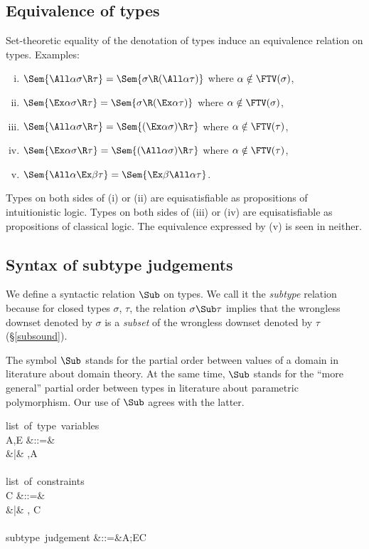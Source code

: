 \documentclass{amsart}
\theoremstyle{definition}
\begin{document}
\subsection{Equivalence of types}
Set-theoretic equality of the denotation of types induce an
equivalence relation on types. Examples:
\begin{enumerate}[(i)]
\item
$\Sem{\All\alpha\sigma\R\tau}=\Sem{\sigma\R(\All\alpha\tau)}$
where $\alpha\notin\FTV(\sigma)$,
\item
$\Sem{\Ex\alpha\sigma\R\tau}=\Sem{\sigma\R(\Ex\alpha\tau)}$
where $\alpha\notin\FTV(\sigma)$,
\item
$\Sem{\All\alpha\sigma\R\tau}=\Sem{(\Ex\alpha\sigma)\R\tau}$
where $\alpha\notin\FTV(\tau)$,
\item
$\Sem{\Ex\alpha\sigma\R\tau}=\Sem{(\All\alpha\sigma)\R\tau}$
where $\alpha\notin\FTV(\tau)$,
\item
$\Sem{\All\alpha\Ex\beta\tau}=\Sem{\Ex\beta\All\alpha\tau}$.
\end{enumerate}
Types on both sides of (i) or (ii) are equisatisfiable as
propositions of intuitionistic logic. Types on both sides of
(iii) or (iv) are equisatisfiable as propositions of classical
logic. The equivalence expressed by (v) is seen in neither.


\subsection{Syntax of subtype judgements}

We define a syntactic relation $\Sub$ on types. We call it the
\emph{subtype} relation because for closed types $\sigma$,
$\tau$, the relation $\sigma \Sub \tau$ implies that the
wrongless downset denoted by $\sigma$ is a \emph{subset} of the
wrongless downset denoted by $\tau$ (\S\ref{subsound}).

The symbol $\Sub$ stands for the partial order between values of
a domain in literature about domain theory. At the same time,
$\Sub$ stands for the ``more general'' partial order between
types in literature about parametric polymorphism. Our use of
$\Sub$ agrees with the latter.

\begin{syntax}
\mbox{list of type variables}\\
A,E
&::=& \emptyset \\
&|& \alpha,A
\\
\\
\mbox{list of constraints}\\
C
&::=& \emptyset \\
&|& \sigma \Sub \tau, C
\\
\\
\mbox{subtype judgement}
&::=&A;E\vdash C
\end{syntax}
\end{document}
